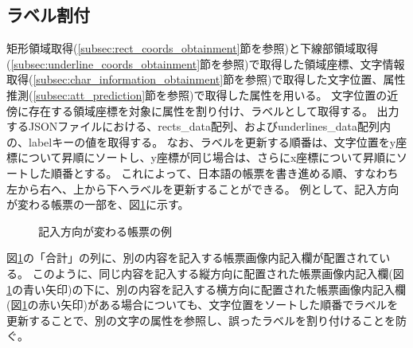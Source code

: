 \subsection{ラベル割付}\label{subsec:label_link}
矩形領域取得(\ref{subsec:rect_coords_obtainment}節を参照)と下線部領域取得(\ref{subsec:underline_coords_obtainment}節を参照)で取得した領域座標、文字情報取得(\ref{subsec:char_information_obtainment}節を参照)で取得した文字位置、属性推測(\ref{subsec:att_prediction}節を参照)で取得した属性を用いる。
文字位置の近傍に存在する領域座標を対象に属性を割り付け、ラベルとして取得する。
出力するJSONファイルにおける、rects\_data配列、およびunderlines\_data配列内の、labelキーの値を取得する。
なお、ラベルを更新する順番は、文字位置をy座標について昇順にソートし、y座標が同じ場合は、さらにx座標について昇順にソートした順番とする。
これによって、日本語の帳票を書き進める順、すなわち左から右へ、上から下へラベルを更新することができる。
例として、記入方向が変わる帳票の一部を、図\ref{fig:label_order}に示す。
\begin{figure}[tp]
    \begin{center}
        \caption{記入方向が変わる帳票の例}
        \label{fig:label_order}
    \end{center}
\end{figure}
図\ref{fig:label_order}の「合計」の列に、別の内容を記入する帳票画像内記入欄が配置されている。
このように、同じ内容を記入する縦方向に配置された帳票画像内記入欄(図\ref{fig:label_order}の青い矢印)の下に、別の内容を記入する横方向に配置された帳票画像内記入欄(図\ref{fig:label_order}の赤い矢印)がある場合についても、文字位置をソートした順番でラベルを更新することで、別の文字の属性を参照し、誤ったラベルを割り付けることを防ぐ。


